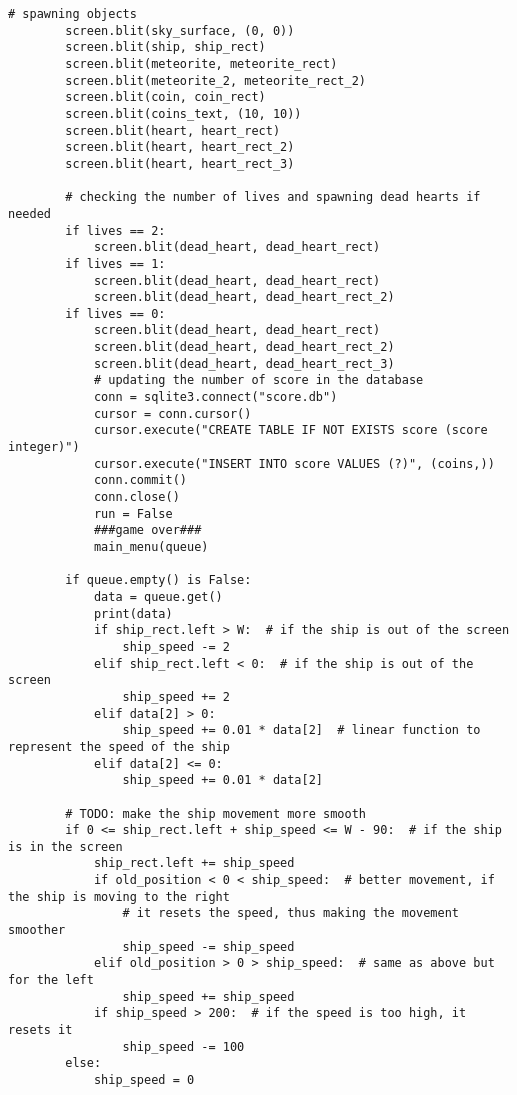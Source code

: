 \documentclass[12pt]{report}			%
\begin{document}
\begin{appendices}
\begin{lstlisting}[title={Program hra.py}, caption={hra.py},  label={lst:hra}]
        # spawning objects
        screen.blit(sky_surface, (0, 0))
        screen.blit(ship, ship_rect)
        screen.blit(meteorite, meteorite_rect)
        screen.blit(meteorite_2, meteorite_rect_2)
        screen.blit(coin, coin_rect)
        screen.blit(coins_text, (10, 10))
        screen.blit(heart, heart_rect)
        screen.blit(heart, heart_rect_2)
        screen.blit(heart, heart_rect_3)

        # checking the number of lives and spawning dead hearts if needed
        if lives == 2:
            screen.blit(dead_heart, dead_heart_rect)
        if lives == 1:
            screen.blit(dead_heart, dead_heart_rect)
            screen.blit(dead_heart, dead_heart_rect_2)
        if lives == 0:
            screen.blit(dead_heart, dead_heart_rect)
            screen.blit(dead_heart, dead_heart_rect_2)
            screen.blit(dead_heart, dead_heart_rect_3)
            # updating the number of score in the database
            conn = sqlite3.connect("score.db")
            cursor = conn.cursor()
            cursor.execute("CREATE TABLE IF NOT EXISTS score (score integer)")
            cursor.execute("INSERT INTO score VALUES (?)", (coins,))
            conn.commit()
            conn.close()
            run = False
            ###game over###
            main_menu(queue)

        if queue.empty() is False:
            data = queue.get()
            print(data)
            if ship_rect.left > W:  # if the ship is out of the screen
                ship_speed -= 2
            elif ship_rect.left < 0:  # if the ship is out of the screen
                ship_speed += 2
            elif data[2] > 0:
                ship_speed += 0.01 * data[2]  # linear function to represent the speed of the ship
            elif data[2] <= 0:
                ship_speed += 0.01 * data[2]

        # TODO: make the ship movement more smooth
        if 0 <= ship_rect.left + ship_speed <= W - 90:  # if the ship is in the screen
            ship_rect.left += ship_speed
            if old_position < 0 < ship_speed:  # better movement, if the ship is moving to the right
                # it resets the speed, thus making the movement smoother
                ship_speed -= ship_speed
            elif old_position > 0 > ship_speed:  # same as above but for the left
                ship_speed += ship_speed
            if ship_speed > 200:  # if the speed is too high, it resets it
                ship_speed -= 100
        else:
            ship_speed = 0


\end{lstlisting}
\end{appendices}
\end{document}
